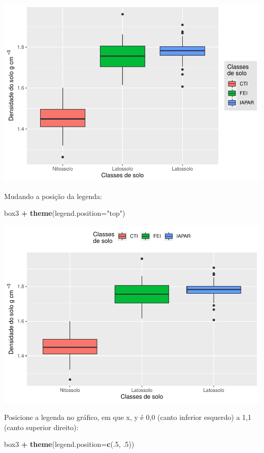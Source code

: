 \documentclass[
]{book}
\newenvironment{Shaded}{\begin{snugshade}}{\end{snugshade}}
\newcommand{\DataTypeTok}[1]{\textcolor[rgb]{0.13,0.29,0.53}{#1}}
\newcommand{\DecValTok}[1]{\textcolor[rgb]{0.00,0.00,0.81}{#1}}
\newcommand{\FloatTok}[1]{\textcolor[rgb]{0.00,0.00,0.81}{#1}}
\newcommand{\KeywordTok}[1]{\textcolor[rgb]{0.13,0.29,0.53}{\textbf{#1}}}
\newcommand{\NormalTok}[1]{#1}
\newcommand{\OperatorTok}[1]{\textcolor[rgb]{0.81,0.36,0.00}{\textbf{#1}}}
\newcommand{\StringTok}[1]{\textcolor[rgb]{0.31,0.60,0.02}{#1}}
\begin{document}
\includegraphics{TudodoR_files/figure-latex/unnamed-chunk-214-2.pdf}

Mudando a posição da legenda:

\begin{Shaded}
\begin{Highlighting}[]
\NormalTok{box3 }\OperatorTok{+}\StringTok{ }\KeywordTok{theme}\NormalTok{(}\DataTypeTok{legend.position=}\StringTok{"top"}\NormalTok{)}
\end{Highlighting}
\end{Shaded}

\includegraphics{TudodoR_files/figure-latex/unnamed-chunk-215-1.pdf}

Posicione a legenda no gráfico, em que x, y é 0,0 (canto inferior esquerdo) a 1,1 (canto superior direito):

\begin{Shaded}
\begin{Highlighting}[]
\NormalTok{box3 }\OperatorTok{+}\StringTok{ }\KeywordTok{theme}\NormalTok{(}\DataTypeTok{legend.position=}\KeywordTok{c}\NormalTok{(.}\DecValTok{5}\NormalTok{, }\FloatTok{.5}\NormalTok{))}
\end{Highlighting}
\end{Shaded}
\end{document}
